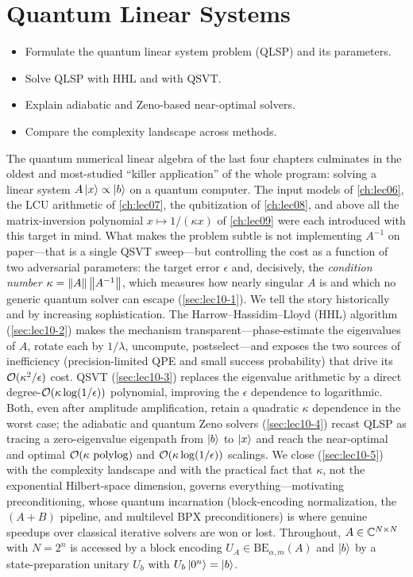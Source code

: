 \chapter{Quantum Linear Systems}
\label{ch:lec10}

\begin{objectives}
\begin{itemize}[leftmargin=1.4em,nosep]
  \item Formulate the quantum linear system problem (QLSP) and its parameters.
  \item Solve QLSP with HHL and with QSVT.
  \item Explain adiabatic and Zeno-based near-optimal solvers.
  \item Compare the complexity landscape across methods.
\end{itemize}
\end{objectives}

The quantum numerical linear algebra of the last four chapters culminates in the
oldest and most-studied ``killer application'' of the whole program: solving a
linear system $A\ket x\propto\ket b$ on a quantum computer. The input models of
\cref{ch:lec06}, the LCU arithmetic of \cref{ch:lec07}, the qubitization of
\cref{ch:lec08}, and above all the matrix-inversion polynomial $x\mapsto1/(\kappa x)$
of \cref{ch:lec09} were each introduced with this target in mind. What makes the
problem subtle is not implementing $A^{-1}$ on paper---that is a single QSVT sweep---but
controlling the cost as a function of two adversarial parameters: the target error
$\epsilon$ and, decisively, the \emph{condition number} $\kappa=\left\lVert A \right\rVert\left\lVert A^{-1} \right\rVert$,
which measures how nearly singular $A$ is and which no generic quantum solver can
escape (\cref{sec:lec10-1}). We tell the story historically and by increasing
sophistication. The Harrow--Hassidim--Lloyd (HHL) algorithm (\cref{sec:lec10-2}) makes
the mechanism transparent---phase-estimate the eigenvalues of $A$, rotate each by
$1/\lambda$, uncompute, postselect---and exposes the two sources of inefficiency
(precision-limited QPE and small success probability) that drive its
$\mathcal{O}(\kappa^2/\epsilon)$ cost. QSVT (\cref{sec:lec10-3}) replaces the eigenvalue
arithmetic by a direct degree-$\mathcal{O}(\kappa\log(1/\epsilon))$ polynomial, improving the
$\epsilon$ dependence to logarithmic. Both, even after amplitude amplification, retain
a quadratic $\kappa$ dependence in the worst case; the adiabatic and quantum Zeno
solvers (\cref{sec:lec10-4}) recast QLSP as tracing a zero-eigenvalue eigenpath from
$\ket b$ to $\ket x$ and reach the near-optimal and optimal $\mathcal{O}(\kappa\,\operatorname{polylog})$
and $\mathcal{O}(\kappa\log(1/\epsilon))$ scalings. We close (\cref{sec:lec10-5}) with the
complexity landscape and with the practical fact that $\kappa$, not the exponential
Hilbert-space dimension, governs everything---motivating preconditioning, whose
quantum incarnation (block-encoding normalization, the $(A+B)$ pipeline, and
multilevel BPX preconditioners) is where genuine speedups over classical iterative
solvers are won or lost. Throughout, $A\in\mathbb{C}^{N\times N}$ with $N=2^n$ is accessed by a
block encoding $U_A\in\mathrm{BE}_{\alpha,m}(A)$ and $\ket b$ by a state-preparation
unitary $U_b$ with $U_b\ket{0^n}=\ket b$.

